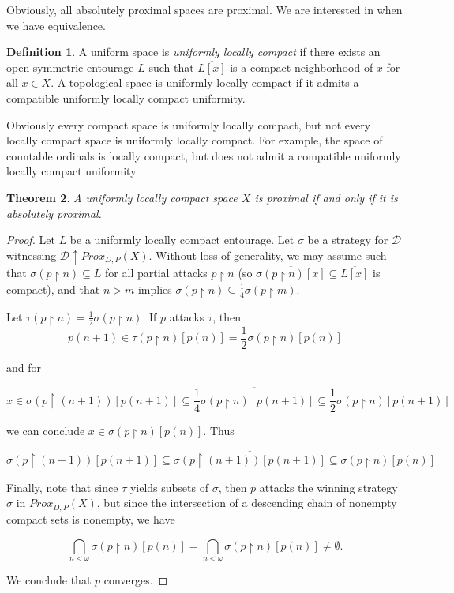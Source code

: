 \documentclass{amsart}
\newtheorem{thm}{Theorem}[section]
\theoremstyle{definition}
\newtheorem{defn}[thm]{Definition}
\theoremstyle{remark}
\newcommand{\<}{\langle}
\renewcommand{\>}{\rangle}
\newcommand{\cl}[1]{\overline{#1}}
\newcommand{\proxgame}[1]{Prox_{D,P}(#1)}
\newcommand{\pl}[1]{\mathscr{#1}}
\newcommand{\win}{\uparrow}
\newcommand{\rest}{\restriction}
\newcommand{\term}{\textit}
\begin{document}
Obviously, all absolutely proximal spaces are proximal. We are interested in when we have equivalence.

\begin{defn}
  A uniform space is \term{uniformly locally compact} if there exists an open symmetric entourage $L$ such that $\cl{L[x]}$ is a compact neighborhood of $x$ for all $x\in X$.  A topological space is uniformly locally compact if it admits a compatible uniformly locally compact uniformity.
\end{defn}


Obviously every compact space is uniformly locally compact, but not every locally compact space is uniformly locally compact.  For example, the space of countable ordinals is locally compact, but does not admit a compatible uniformly locally compact uniformity.

\begin{thm}
  A uniformly locally compact space $X$ is proximal if and only if it is absolutely proximal.
\end{thm}

\begin{proof}
  Let $L$ be a uniformly locally compact entourage. Let $\sigma$ be a strategy for $\pl D$ witnessing $\pl D\win \proxgame{X}$. Without loss of generality, we may assume such that $\sigma(p\rest n)\subseteq L$ for all partial attacks $p\rest n$ (so $\cl{\sigma(p\rest n)[x]}\subseteq\cl{L[x]}$ is compact), and that $n > m$ implies $\sigma(p\rest n)\subseteq \frac{1}{4}\sigma(p\rest m)$.

  Let $\tau(p\rest n)=\frac{1}{2}\sigma(p\rest n)$. If $p$ attacks $\tau$, then
    \[
      p(n+1)
        \in
      \tau(p\rest n)[p(n)]
        =
      \frac{1}{2}\sigma(p\rest n)[p(n)]
    \]

    and for

    \[
      x
        \in
      \cl{\sigma(p\rest (n+1))[p(n+1)]}
        \subseteq
      \cl{\frac{1}{4}\sigma(p\rest n)[p(n+1)]}
        \subseteq
      \frac{1}{2}\sigma(p\rest n)[p(n+1)]
    \]

  we can conclude $x\in\sigma(p\rest n)[p(n)]$. Thus

    \[
      \sigma(p\rest (n+1))[p(n+1)]
        \subseteq
      \cl{\sigma(p\rest (n+1))[p(n+1)]}
        \subseteq
      \sigma(p\rest n)[p(n)]
    \]

  Finally, note that since $\tau$ yields subsets of $\sigma$, then $p$ attacks the winning strategy $\sigma$ in $\proxgame{X}$, but since the intersection of a descending chain of nonempty compact sets is nonempty, we have

    \[
      \bigcap_{n<\omega} \sigma(p\rest n)[p(n)]
        =
      \bigcap_{n<\omega} \cl{\sigma(p\rest n)[p(n)]}
        \not=
      \emptyset.
    \]

  We conclude that $p$ converges.
\end{proof}
\end{document}
